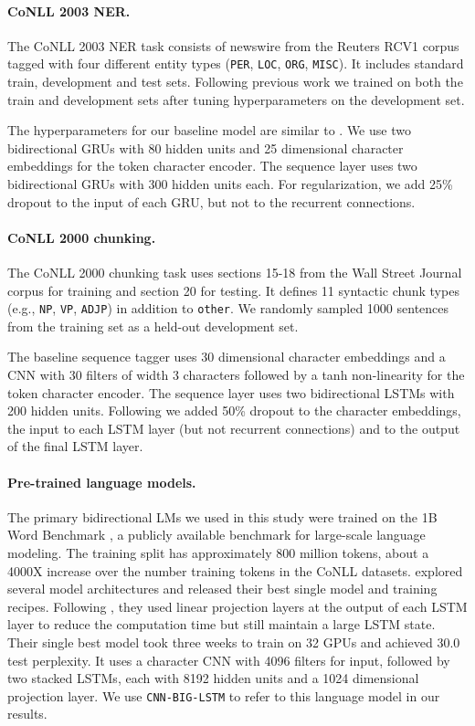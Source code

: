 \documentclass[11pt,a4paper]{article}
\begin{document}
\paragraph{CoNLL 2003 NER.}
The CoNLL 2003 NER task consists of newswire from the Reuters RCV1 corpus tagged with four
different entity types (\texttt{PER}, \texttt{LOC}, \texttt{ORG}, \texttt{MISC}).  It includes
standard train, development and test sets.  Following previous work \citep{yang-transfer-iclr07,chiu-nichols-2016} we trained on both the train and development sets after tuning hyperparameters on the development set. 

The hyperparameters for our baseline model are similar to \citet{yang-transfer-iclr07}.
We use two bidirectional GRUs with 80 hidden units and 25 dimensional character embeddings for the token character
encoder.  The sequence layer uses two bidirectional GRUs with 300 hidden units each.  For regularization, we add
25\% dropout to the input of each GRU, but not to the recurrent connections.

\paragraph{CoNLL 2000 chunking.}
The CoNLL 2000 chunking task uses sections 15-18 from the Wall Street Journal corpus for training and
section 20 for testing.  It defines 11 syntactic chunk types (e.g., \texttt{NP}, \texttt{VP}, \texttt{ADJP})
in addition to \texttt{other}.  
We randomly sampled 1000 sentences from the training
set as a held-out development set.

The baseline sequence tagger uses 30 dimensional character embeddings and a CNN with 30 filters of width 3 characters followed
by a tanh non-linearity for the token character encoder.
The sequence layer uses two bidirectional LSTMs with 200 hidden units.  Following \citet{Ma2016EndtoendSL} we
added 50\% dropout to the character embeddings, the input to each LSTM layer (but not recurrent connections)
and to the output of the final LSTM layer.

\paragraph{Pre-trained language models.}
\label{sec:language_models}

The primary bidirectional LMs we used in this study were trained
on the 1B Word Benchmark \cite{Chelba2014OneBW}, a publicly available benchmark for large-scale language modeling.
The training split has approximately 800 million tokens, about a 4000X increase over the number training tokens in the CoNLL datasets.  
\citet{Jzefowicz2016ExploringTL} explored several model architectures and released their best single model and training recipes.
Following \citet{Sak2014LongSM}, they used linear projection layers at the output of each LSTM layer to reduce the computation time but still maintain a large LSTM state.
Their single best model took three weeks to train on 32 GPUs and achieved 30.0 test perplexity.  It uses a character CNN with 4096 filters for input, followed by two stacked LSTMs, each with 8192 hidden units and a 1024 dimensional projection layer.
We use \texttt{CNN-BIG-LSTM} to refer to this language model in our results.
\end{document}
